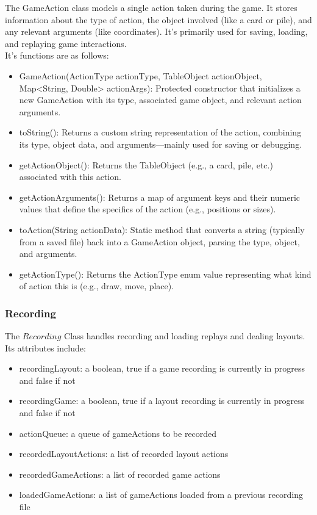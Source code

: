 \documentclass[a4paper]{project}
\begin{document}
				The GameAction class models a single action taken during the game. It stores information about the type of action, the object involved (like a card or pile), and any relevant arguments (like coordinates). It's primarily used for saving, loading, and replaying game interactions. \\
				It’s functions are as follows:
				
				\begin{itemize}
					\item GameAction(ActionType actionType, TableObject actionObject, Map<String, Double> actionArgs): Protected constructor that initializes a new GameAction with its type, associated game object, and relevant action arguments.
					\item toString(): Returns a custom string representation of the action, combining its type, object data, and arguments—mainly used for saving or debugging.
					\item getActionObject(): Returns the TableObject (e.g., a card, pile, etc.) associated with this action.
					\item getActionArguments(): Returns a map of argument keys and their numeric values that define the specifics of the action (e.g., positions or sizes).
					\item toAction(String actionData): Static method that converts a string (typically from a saved file) back into a GameAction object, parsing the type, object, and arguments.
					\item getActionType(): Returns the ActionType enum value representing what kind of action this is (e.g., draw, move, place).
				\end{itemize}
			
			\subsubsection{Recording}\label{subsubsec:recording}
				
				The $Recording$ Class handles recording and loading replays and dealing layouts. \\
				Its attributes include:
				
				\begin{itemize}
					\item recordingLayout: a boolean, true if a game recording is currently in progress and false if not
					\item recordingGame: a boolean, true if a layout recording is currently in progress and false if not
					\item actionQueue: a queue of gameActions to be recorded
					\item recordedLayoutActions: a list of recorded layout actions
					\item recordedGameActions: a list of recorded game actions
					\item loadedGameActions: a list of gameActions loaded from a previous recording file
				\end{itemize}
				
\end{document}
